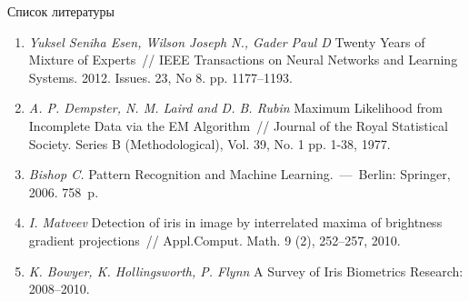 \documentclass[9pt,pdf,hyperref={unicode}]{beamer}
\begin{document}
\begin{frame}{Список литературы}
	\begin{enumerate}
	\justifying
		\item \textit{Yuksel Seniha Esen, Wilson Joseph N., Gader Paul D} Twenty Years of Mixture of Experts~// IEEE Transactions on Neural Networks and Learning Systems. 2012. Issues. 23, No 8. pp. 1177--1193.
		\item \textit{A. P. Dempster, N. M. Laird and D. B. Rubin} Maximum Likelihood from Incomplete Data via the EM Algorithm~// Journal of the Royal Statistical Society. Series B (Methodological), Vol. 39, No. 1 pp. 1-38, 1977.
		\item \textit{Bishop C.} Pattern Recognition and Machine Learning.~---~Berlin: Springer, 2006. 758~p.
		\item \textit{I. Matveev} Detection of iris in image by interrelated maxima of brightness gradient projections~// Appl.Comput. Math. 9 (2), 252–257, 2010.
		\item \textit{K. Bowyer, K. Hollingsworth, P. Flynn} A Survey of Iris Biometrics Research: 2008–2010.
		
	\end{enumerate}
\end{frame}
\end{document}
